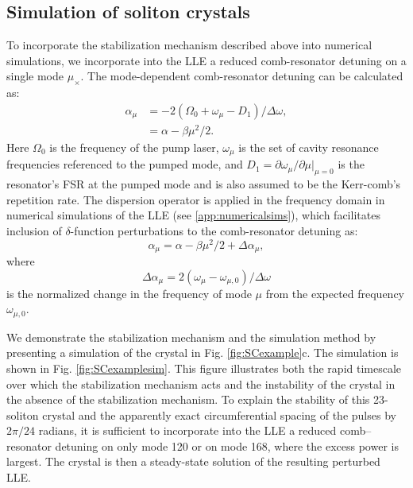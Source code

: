 \subsection{Simulation of soliton crystals}

To incorporate the stabilization mechanism described above into numerical simulations, we incorporate into the LLE a reduced comb-resonator detuning on a single mode $\mu_\times$. The mode-dependent comb-resonator detuning can be calculated as:
\begin{align}
\alpha_\mu&=-2(\Omega_0+\omega_\mu-D_1)/\Delta\omega,\\
&=\alpha-\beta\mu^2/2.
\end{align}
Here $\Omega_0$ is the frequency of the pump laser, $\omega_\mu$ is the set of cavity resonance frequencies referenced to the pumped mode, and $D_1=\partial\omega_\mu/\partial\mu|_{\mu=0}$ is the resonator's FSR at the pumped mode and is also assumed to be the Kerr-comb's repetition rate. The dispersion operator is applied in the frequency domain in numerical simulations of the LLE (see \ref{app:numericalsims}), which facilitates inclusion of $\delta$-function perturbations to the comb-resonator detuning as:
\begin{equation}
\alpha_\mu=\alpha-\beta\mu^2/2+\Delta\alpha_\mu,
\end{equation}
where
\begin{equation}
\Delta\alpha_\mu=2(\omega_\mu-\omega_{\mu,0})/\Delta\omega
\end{equation}
is the normalized change in the frequency of mode $\mu$ from the expected frequency $\omega_{\mu,0}$. 

We demonstrate the stabilization mechanism and the simulation method by presenting a simulation of the crystal in Fig. \ref{fig:SCexample}c. The simulation is shown in Fig. \ref{fig:SCexamplesim}. This figure illustrates both the rapid timescale over which the stabilization mechanism acts and the instability of the crystal in the absence of the stabilization mechanism. To explain the stability of this 23-soliton crystal and the apparently exact circumferential spacing of the pulses by $2\pi/24$ radians, it is sufficient to incorporate into the LLE a reduced comb–resonator detuning on only mode 120 or on mode 168, where the excess power is largest. The crystal is then a steady-state solution of the resulting perturbed LLE.


